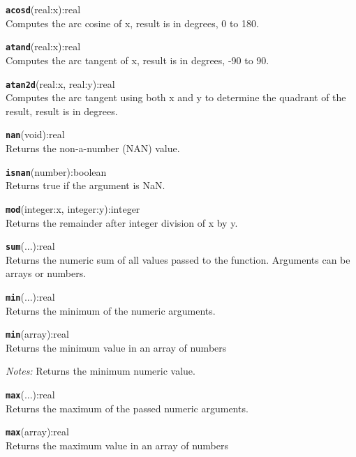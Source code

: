 \hrulefill

\texttt{{\large\textbf{acosd}}}\textsf{(real:x):real}\\
 Computes the arc cosine of x, result is in degrees, 0 to 180.

\hrulefill

\texttt{{\large\textbf{atand}}}\textsf{(real:x):real}\\
 Computes the arc tangent of x, result is in degrees, -90 to 90.

\hrulefill

\texttt{{\large\textbf{atan2d}}}\textsf{(real:x, real:y):real}\\
 Computes the arc tangent using both x and y to determine the quadrant of the result, result is in degrees.

\hrulefill

\texttt{{\large\textbf{nan}}}\textsf{(void):real}\\
 Returns the non-a-number (NAN) value.

\hrulefill

\texttt{{\large\textbf{isnan}}}\textsf{(number):boolean}\\
 Returns true if the argument is NaN.

\hrulefill

\texttt{{\large\textbf{mod}}}\textsf{(integer:x, integer:y):integer}\\
 Returns the remainder after integer division of x by y.

\hrulefill

\texttt{{\large\textbf{sum}}}\textsf{(...):real}\\
 Returns the numeric sum of all values passed to the function. Arguments can be arrays or numbers.

\hrulefill

\texttt{{\large\textbf{min}}}\textsf{(...):real}\\
 Returns the minimum of the numeric arguments.

\texttt{{\large\textbf{min}}}\textsf{(array):real}\\
 Returns the minimum value in an array of numbers

\emph{Notes:} Returns the minimum numeric value.

\hrulefill

\texttt{{\large\textbf{max}}}\textsf{(...):real}\\
 Returns the maximum of the passed numeric arguments.

\texttt{{\large\textbf{max}}}\textsf{(array):real}\\
 Returns the maximum value in an array of numbers

